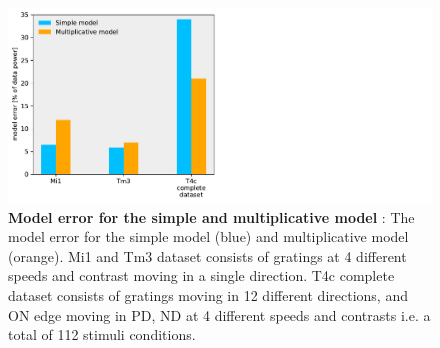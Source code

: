 \documentclass[9pt,lineno]{elife}
\begin{document}
\begin{figure}
\begin{fullwidth}
\hspace*{2cm}\includegraphics[width=0.84\linewidth]{figure9}
\caption{\textbf{Model error for the simple and multiplicative model} : The model error for the simple model (blue) and multiplicative model (orange). Mi1 and Tm3 dataset consists of gratings at 4 different speeds and contrast moving in a single direction. T4c complete dataset consists of gratings moving in 12 different directions, and ON edge moving in PD, ND at 4 different speeds and contrasts i.e. a total of 112 stimuli conditions.}

\label{FitError}
	
\end{fullwidth}
\end{figure} 
\end{document}
